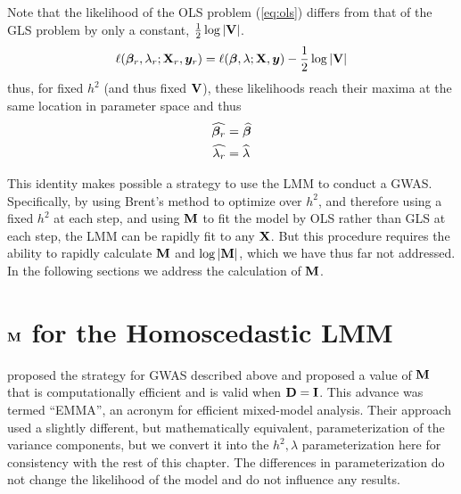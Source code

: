 Note that the likelihood of the OLS problem (\cref{eq:ols}) differs from that of the GLS problem by only a constant, $\frac{1}{2}\log|\mathbf{V}|$.
\begin{align}
  \ell(\boldsymbol{\beta}_r, \lambda_r; \mathbf{X}_r, \bm{y}_r) = \ell(\boldsymbol{\beta}, \lambda; \mathbf{X}, \bm{y}) -\frac{1}{2}\log|\mathbf{V}|
\end{align}
thus, for fixed $h^2$ (and thus fixed $\mathbf{V}$), these likelihoods reach their maxima at the same location in parameter space and thus
\begin{align}
\widehat{\boldsymbol{\beta}_r} &= \widehat{\boldsymbol{\beta}}\\
\widehat{\lambda_r} & = \widehat{\lambda}
\end{align}

This identity makes possible a strategy to use the LMM to conduct a GWAS.
Specifically, by using Brent's method to optimize over $h^2$, and therefore using a fixed $h^2$ at each step, and using $\mathbf{M}$ to fit the model by OLS rather than GLS at each step, the LMM can be rapidly fit to any $\mathbf{X}$.
But this procedure requires the ability to rapidly calculate $\mathbf{M}$ and $\log \left| \mathbf{M} \right|$, which we have thus far not addressed.
In the following sections we address the calculation of $\mathbf{M}$.






\section{\texorpdfstring{$\mathbf{M}$}{M} for the Homoscedastic LMM}

\citet{Kang2008} proposed the strategy for GWAS described above and proposed a value of $\mathbf{M}$ that is computationally efficient and is valid when $\mathbf{D} = \mathbf{I}$.
This advance was termed ``EMMA'', an acronym for efficient mixed-model analysis.
Their approach used a slightly different, but mathematically equivalent, parameterization of the variance components, but we convert it into the $h^2, \lambda$ parameterization here for consistency with the rest of this chapter.
The differences in parameterization do not change the likelihood of the model and do not influence any results.

